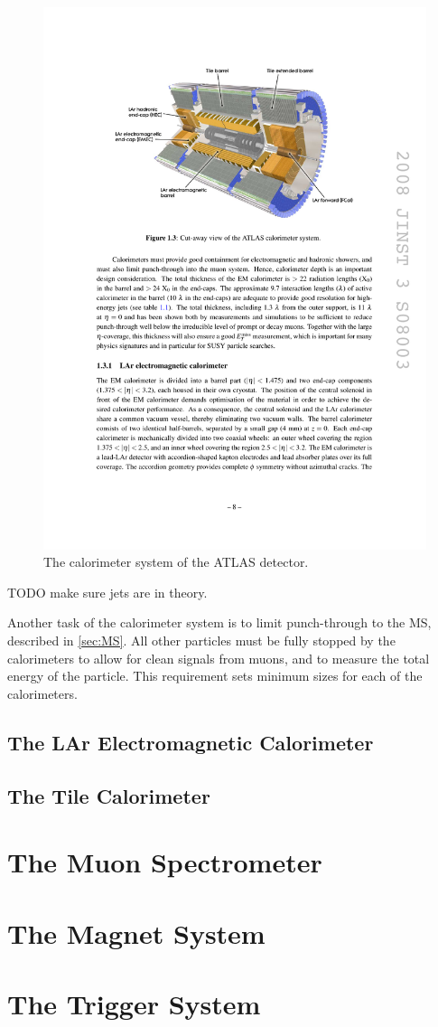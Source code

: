 \begin{centering}
\begin{figure}[bth]
\myfloatalign
\includegraphics[width=.90\linewidth]{figures/atlas/calorimeters.pdf}
\caption{The calorimeter system of the ATLAS detector.}
\label{fig:calo}
\end{figure}
\end{centering}

TODO make sure jets are in theory.

Another task of the calorimeter system is to limit punch-through to the \ac{MS}, described in \autoref{sec:MS}. All other particles must be fully stopped by the calorimeters to allow for clean signals from muons, and to measure the total energy of the particle. This requirement sets minimum sizes for each of the calorimeters. 

\subsection{The LAr Electromagnetic Calorimeter}



\subsection{The Tile Calorimeter}

\section{The Muon Spectrometer}
\label{sec:MS}

\section{The Magnet System}

\section{The Trigger System}
\label{sec:Trigger}